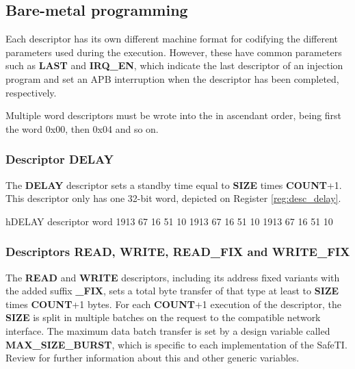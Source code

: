 \subsection{Bare-metal programming}
\label{software-program}
Each descriptor has its own different machine format for codifying the different parameters used during the execution. 
However, these have common parameters such as \textbf{LAST} and \textbf{IRQ\_EN}, which indicate the last descriptor of 
an injection program and set an APB interruption when the descriptor has been completed, respectively. 

Multiple word descriptors must be wrote into the  in ascendant order, being first the word 0x00, then 0x04 and so on. 


\subsubsection{Descriptor DELAY}
\label{software-program-delay}
The \textbf{DELAY} descriptor sets a standby time equal to \textbf{SIZE} times \textbf{COUNT}+1. 
This descriptor only has one 32-bit word, depicted on Register \ref{reg:desc_delay}. 

\begin{register}{h}{DELAY descriptor word}{}
  \label{reg:desc_delay}
  \regfieldb{}              {19}{13}
  \regfieldb{}              {6}{7}
  \regfieldb{}              {1}{6}
  \regfieldb{}              {5}{1}
  \regfieldb{}              {1}{0}
           {19}{13}
            {6}{7}
            {1}{6}
            {5}{1}
            {1}{0}
         {19}{13}
        {6}{7}
      {1}{6}
        {5}{1}
         {1}{0}
  \regnewline
\end{register}


\subsubsection{Descriptors READ, WRITE, READ\_FIX and WRITE\_FIX}
\label{software-program-rd_wr}
The \textbf{READ} and \textbf{WRITE} descriptors, including its address fixed variants with the added suffix \textbf{\_FIX}, sets a total byte transfer of that 
type at least to \textbf{SIZE} times \textbf{COUNT}+1 bytes.
For each \textbf{COUNT}+1 execution of the descriptor, the \textbf{SIZE} is split in multiple batches on the request to the compatible network interface.
The maximum data batch transfer is set by a design variable called \textbf{MAX\_SIZE\_BURST}, which is specific to each implementation of the SafeTI. 
Review \fullref{} for further information about this and other generic variables.

